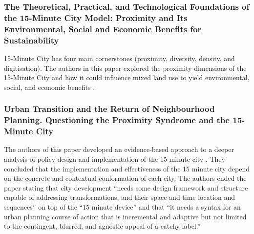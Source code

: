 \subsubsection{The Theoretical, Practical, and Technological Foundations of the 15-Minute City Model: Proximity and Its Environmental, Social and Economic Benefits for Sustainability}

15-Minute City has four main cornerstones (proximity, diversity, density, and digitisation). The authors in this paper explored the proximity dimensions of the 15-Minute City and how it could influence mixed land use to yield environmental, social, and economic benefits \cite{allam_theoretical_2022}.

\subsubsection{Urban Transition and the Return of Neighbourhood Planning. Questioning the Proximity Syndrome and the 15-Minute City}

The authors of this paper developed an evidence-based approach to a deeper analysis of policy design and implementation of the 15 minute city \cite{marchigiani_urban_2022}. They concluded that the implementation and effectiveness of the 15 minute city depend on the concrete and contextual conformation of each city. The authors ended the paper stating that city development “needs some design framework and structure capable of addressing transformations, and their space and time location and sequences” on top of the “15 minute device” and that “it needs a syntax for an urban planning course of action that is incremental and adaptive but not limited to the contingent, blurred, and agnostic appeal of a catchy label.”
